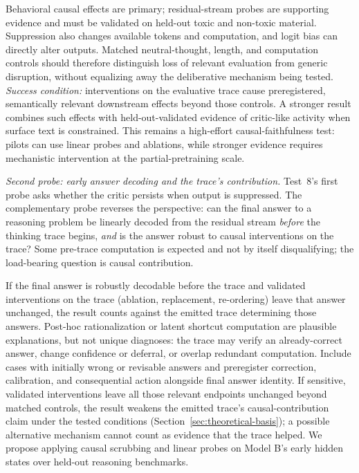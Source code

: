 \documentclass[11pt]{article}
\begin{document}
Behavioral causal effects are primary; residual-stream probes are supporting
evidence and must be validated on held-out toxic and non-toxic material.
Suppression also changes available tokens and computation, and logit bias can
directly alter outputs. Matched neutral-thought, length, and computation
controls should therefore distinguish loss of relevant evaluation from generic
disruption, without equalizing away the deliberative mechanism being tested.
\emph{Success condition:} interventions on the evaluative trace cause
preregistered, semantically relevant downstream effects beyond those controls.
A stronger result combines such effects with held-out-validated evidence of
critic-like activity when surface text is constrained. This remains a
high-effort causal-faithfulness test: pilots can use linear probes and
ablations, while stronger evidence requires mechanistic intervention at the
partial-pretraining scale.

\textit{Second probe: early answer decoding and the trace's contribution.}
Test~8's first probe asks whether the critic persists when output is
suppressed. The complementary probe reverses the perspective: can the final
answer to a reasoning problem be linearly decoded from the residual stream
\emph{before} the
thinking trace begins, \emph{and} is the answer robust to causal
interventions on the trace? Some pre-trace computation is expected and
not by itself disqualifying; the load-bearing question is causal
contribution.

If the final answer is robustly decodable before the trace and validated
interventions on the trace (ablation, replacement, re-ordering) leave that
answer unchanged, the result counts against the emitted trace determining
those answers. Post-hoc rationalization or latent shortcut computation are
plausible explanations, but not unique diagnoses: the trace may verify an
already-correct answer, change confidence or deferral, or overlap redundant
computation. Include cases with initially wrong or revisable answers and
preregister correction, calibration, and consequential action alongside final
answer identity. If sensitive, validated interventions leave all those relevant
endpoints unchanged beyond matched controls, the result weakens the emitted
trace's causal-contribution claim under the tested conditions
(Section~\ref{sec:theoretical-basis}); a possible alternative mechanism cannot
count as evidence that the trace helped. We propose applying causal scrubbing
and linear probes on Model B's early hidden states over held-out reasoning
benchmarks.
\end{document}
